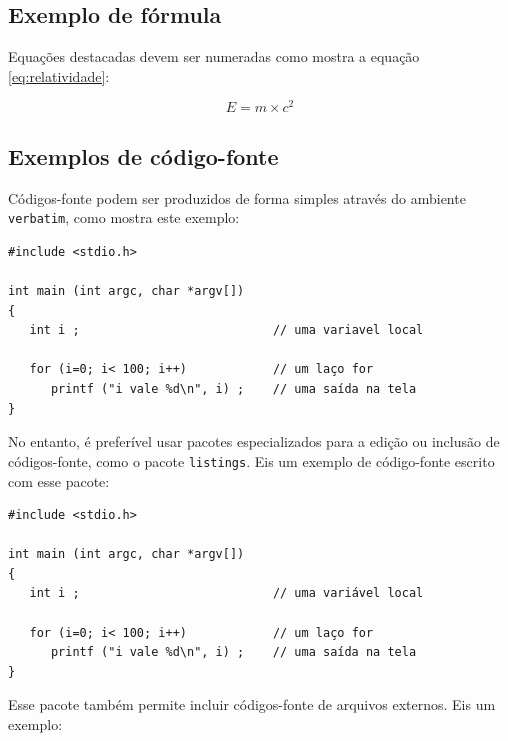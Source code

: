 
\subsection{Exemplo de fórmula}

Equações destacadas devem ser numeradas como mostra a equação \ref{eq:relatividade}:

\begin{equation}
E = m \times c^2
\label{eq:relatividade}
\end{equation}


\subsection{Exemplos de código-fonte}

Códigos-fonte podem ser produzidos de forma simples através do ambiente \texttt{verbatim}, como mostra este exemplo:

\begin{footnotesize}
\begin{verbatim}
#include <stdio.h>

int main (int argc, char *argv[])
{
   int i ;                           // uma variavel local

   for (i=0; i< 100; i++)            // um laço for
      printf ("i vale %d\n", i) ;    // uma saída na tela
}
\end{verbatim}
\end{footnotesize}

No entanto, é preferível usar pacotes especializados para a edição ou inclusão de códigos-fonte, como o pacote \texttt{listings}. Eis um exemplo de código-fonte escrito com esse pacote:


\begin{lstlisting}
#include <stdio.h>

int main (int argc, char *argv[])
{
   int i ;                           // uma variável local

   for (i=0; i< 100; i++)            // um laço for
      printf ("i vale %d\n", i) ;    // uma saída na tela
}
\end{lstlisting}

Esse pacote também permite incluir códigos-fonte de arquivos externos. Eis um exemplo:

